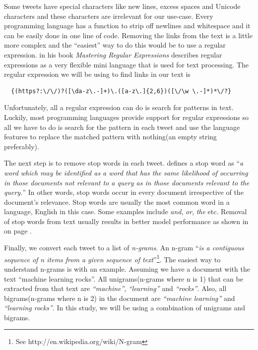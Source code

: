 Some tweets have special characters like new lines, excess spaces and Unicode characters and these
characters are irrelevant for our use-case. Every programming language has a function to strip
off newlines and whitespace and it can be easily done in one line of code. Removing the links from
the text is a little more complex and the ``easiest'' way to do this would be to use a regular
expression. \citet{friedl2006mastering} in his book \textit{Mastering Regular Expressions} describes
regular expressions as a very flexible mini language that is used for text processing. The regular
expression we will be using to find links in our text is
\begin{verbatim}
  {(https?:\/\/)?([\da-z\.-]+)\.([a-z\.]{2,6})([\/\w \.-]*)*\/?}
\end{verbatim}

Unfortunately, all a regular expression can do is search for patterns in text. Luckily, most
programming languages provide support for regular expressions so all we have to do is search for the
pattern in each tweet and use the language features to replace the matched pattern with nothing(an
empty string preferably).

The next step is to remove stop words in each tweet. \citet{wilbur1992automatic} defines a stop word
as ``\textit{a word which may be identified as a word that has the same likelihood of occurring in
those documents not relevant to a query as in those documents relevant to the query.}'' In other
words, stop words occur in every document irrespective of the document's relevance. Stop words are
usually the most common word in a language, English in this case. Some examples include
\textit{and}, \textit{or}, \textit{the} etc. Removal of stop words from text usually results in
better model performance as shown in  on page
\pageref{fig:auc-curves-stopwords}.


Finally, we convert each tweet to a list of \textit{n-grams}. An n-gram ``\textit{is a contiguous
sequence of n items from a given sequence of text}''\footnote{See
http://en.wikipedia.org/wiki/N-gram}. The easiest way to understand n-grams is with an example.
Assuming we have a document with the text ``machine learning rocks''. All unigrams(n-grams
where n is 1) that can be extracted from that text are \textit{``machine''}, \textit{``learning''}
and \textit{``rocks''}. Also, all bigrams(n-grams where n is 2) in the document are
\textit{``machine learning''} and \textit{``learning rocks''}. In this study, we will be using a
combination of unigrams and bigrams.

